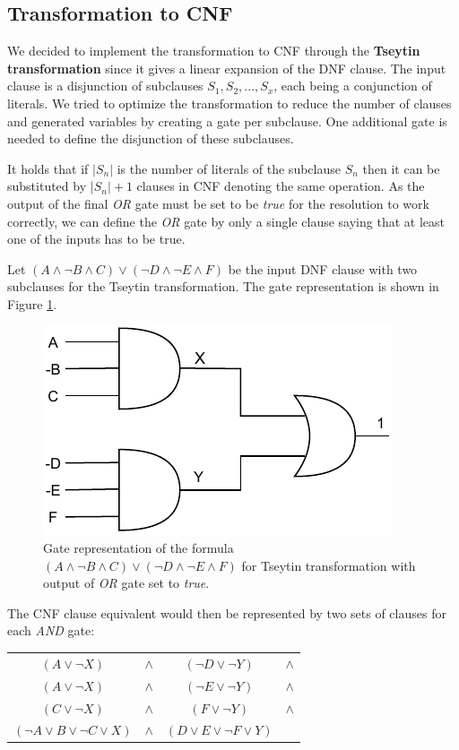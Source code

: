 \subsection*{Transformation to CNF}
We decided to implement the transformation to CNF through the \textbf{Tseytin transformation} since it gives a linear expansion of the DNF clause. The input clause is a disjunction of subclauses $S_1, S_2,..., S_x$, each being a conjunction of literals. We tried to optimize the transformation to reduce the number of clauses and generated variables by creating a gate per subclause. One additional gate is needed to define the disjunction of these subclauses.

It holds that if $|S_n|$ is the number of literals of the subclause $S_n$ then it can be substituted by $|S_n|+1$ clauses in CNF denoting the same operation. As the output of the final \textit{OR} gate must be set to be \textit{true} for the resolution to work correctly, we can define the \textit{OR} gate by only a single clause saying that at least one of the inputs has to be true.

Let $(A \land \neg B \land C)\lor(\neg D \land  \neg E \land F)$ be the input DNF clause with two subclauses for the Tseytin transformation. The gate representation is shown in Figure \ref{fig:Tsei_opt}.

\begin{figure}[ht]
    \label{fig:Tsei_opt}
    \centering
    \includegraphics[width=0.5\linewidth]{obrazky-figures/Tseitin_opt.drawio.pdf}
    \caption{Gate representation of the formula $(A \land \neg B \land C)\lor(\neg D \land  \neg E \land F)$ for Tseytin transformation with output of \textit{OR} gate set to \textit{true}.}
\end{figure}

The CNF clause equivalent would then be represented by two sets of clauses for each \textit{AND} gate:

\begin{center}
    \begin{tabular}{c c c c}
      $(A \lor \neg X)$ & $\land $ & $(\neg D \lor \neg Y)$ & $\land $\\
      $(A \lor \neg X)$ & $\land $ & $(\neg E \lor \neg Y)$ & $\land $ \\ 
      $(C \lor \neg X)$    &  $\land $ &  $(F \lor \neg Y)$   & $\land $\\
      $(\neg A \lor B \lor \neg C \lor X)$    & $\land $ &    $(D \lor E \lor \neg F \lor Y )$  &\\
\end{tabular}
\end{center}

